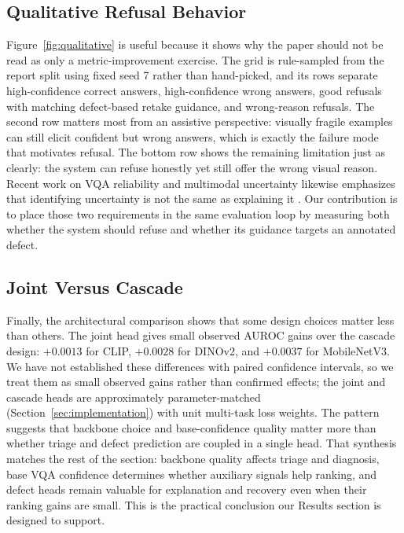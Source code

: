 \documentclass{ieeeaccess}
\newcommand{\clip}{CLIP}
\newcommand{\dinov}{DINOv2}
\newcommand{\mobilenet}{MobileNetV3}
\begin{document}
\subsection{Qualitative Refusal Behavior}
Figure~\ref{fig:qualitative} is useful because it shows why the paper should not be read as only a metric-improvement exercise. The grid is rule-sampled from the report split using fixed seed 7 rather than hand-picked, and its rows separate high-confidence correct answers, high-confidence wrong answers, good refusals with matching defect-based retake guidance, and wrong-reason refusals. The second row matters most from an assistive perspective: visually fragile examples can still elicit confident but wrong answers, which is exactly the failure mode that motivates refusal. The bottom row shows the remaining limitation just as clearly: the system can refuse honestly yet still offer the wrong visual reason. Recent work on VQA reliability and multimodal uncertainty likewise emphasizes that identifying uncertainty is not the same as explaining it \cite{whitehead2022reliable,khan2024consistency,groot2024overconfidence}. Our contribution is to place those two requirements in the same evaluation loop by measuring both whether the system should refuse and whether its guidance targets an annotated defect.

\subsection{Joint Versus Cascade}
Finally, the architectural comparison shows that some design choices matter less than others. The joint head gives small observed AUROC gains over the cascade design: $+0.0013$ for \clip{}, $+0.0028$ for \dinov{}, and $+0.0037$ for \mobilenet{}. We have not established these differences with paired confidence intervals, so we treat them as small observed gains rather than confirmed effects; the joint and cascade heads are approximately parameter-matched (Section~\ref{sec:implementation}) with unit multi-task loss weights. The pattern suggests that backbone choice and base-confidence quality matter more than whether triage and defect prediction are coupled in a single head. That synthesis matches the rest of the section: backbone quality affects triage and diagnosis, base VQA confidence determines whether auxiliary signals help ranking, and defect heads remain valuable for explanation and recovery even when their ranking gains are small. This is the practical conclusion our Results section is designed to support.
\end{document}
